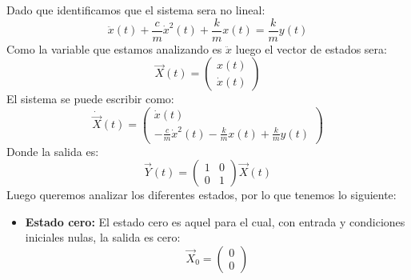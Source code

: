 \documentclass[
  11pt,
  letterpaper,
   addpoints,
   answers
  ]{exam}
\begin{document}
\begin{questions}
\begin{solution}
Dado que identificamos que el sistema sera no lineal:
\begin{equation}
  \ddot{x}(t) + \frac{c}{m} \dot{x}^2(t) + \frac{k}{m} x(t) = \frac{k}{m} y(t)
\end{equation}
Como la variable que estamos analizando es $\ddot{x}$ luego el vector de estados sera:
\begin{equation}
  \vec{X}(t) = \begin{pmatrix} x(t) \\ \dot{x}(t) \end{pmatrix}
\end{equation}
El sistema se puede escribir como:
\begin{equation}
  \dot{\vec{X}}(t) = \begin{pmatrix} \dot{x}(t) \\ -\frac{c}{m} \dot{x}^2(t) - \frac{k}{m} x(t) + \frac{k}{m} y(t) \end{pmatrix}
\end{equation}
Donde la salida es:
\begin{equation}
  \vec{Y}(t) = \begin{pmatrix} 1 & 0 \\ 0 & 1 \end{pmatrix} \vec{X}(t)
\end{equation}
Luego queremos analizar los diferentes estados, por lo que tenemos lo siguiente:
\begin{itemize}
    \item \textbf{Estado cero:} El estado cero es aquel para el cual, con entrada y condiciones iniciales nulas, la salida es cero:
\begin{equation}
  \vec{X}_0 = \begin{pmatrix} 0 \\ 0 \end{pmatrix}
\end{equation}


\end{itemize}
\end{solution}
\end{questions}
\end{document}
